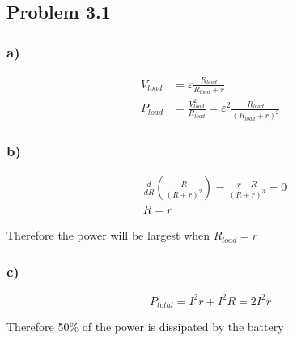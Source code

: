 \documentclass[../homework.tex]{subfiles}
\begin{document}
\subsection{Problem 3.1}
\subsubsection*{a)}
\begin{align*}
    V_{load} &= \varepsilon\frac{R_{load}}{R_{load} + r} \\
    P_{load} &= \frac{V_{load}^2}{R_{load}} = \varepsilon^2 \frac{R_{load}}{(R_{load} + r)^2}
\end{align*}
\subsubsection*{b)}
\begin{align*}
    &\frac{d}{dR}\left(\frac{R}{(R+r)^2}\right) = \frac{r-R}{(R+r)^3} = 0 \\
    &R = r
\end{align*}

Therefore the power will be largest when $R_{load} = r$
\subsubsection*{c)}
\begin{equation*}
    P_{total} = I^2 r + I^2 R = 2I^2r
\end{equation*}

Therefore 50\% of the power is dissipated by the battery 
\end{document}
